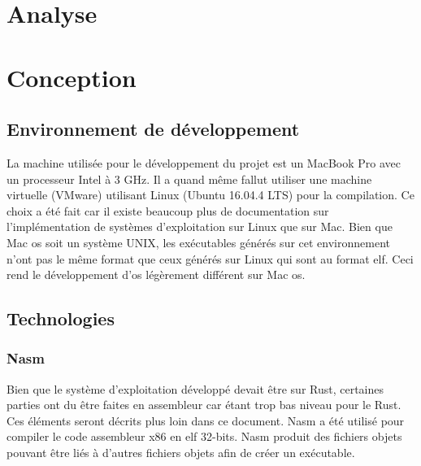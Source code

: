 \documentclass[a4paper]{article}
\begin{document}
\newpage

\section{Analyse}

\newpage

\section{Conception}
\subsection{Environnement de développement}
La machine utilisée pour le développement du projet est un MacBook Pro avec un
processeur Intel à 3 GHz. Il a quand même fallut utiliser une machine virtuelle
(VMware) utilisant Linux (Ubuntu 16.04.4 LTS) pour la compilation. Ce choix a été
fait car il existe beaucoup plus de documentation sur l'implémentation de systèmes
d'exploitation sur Linux que sur Mac. Bien que Mac \acrshort{os} soit un système UNIX, les
exécutables générés sur cet environnement n'ont pas le même format que ceux générés
sur Linux qui sont au format \acrshort{elf}. Ceci rend le développement d'\acrshort{os} légèrement
différent sur Mac \acrshort{os}.


\subsection{Technologies}
\subsubsection{Nasm}
Bien que le système d'exploitation développé devait être sur Rust, certaines parties
ont du être faites en assembleur car étant trop bas niveau pour le Rust. Ces éléments
seront décrits plus loin dans ce document. Nasm a été  utilisé pour compiler le
code assembleur x86 en \acrshort{elf} 32-bits. Nasm produit des fichiers objets pouvant être
liés à d'autres fichiers objets afin de créer un exécutable. \\
\end{document}
